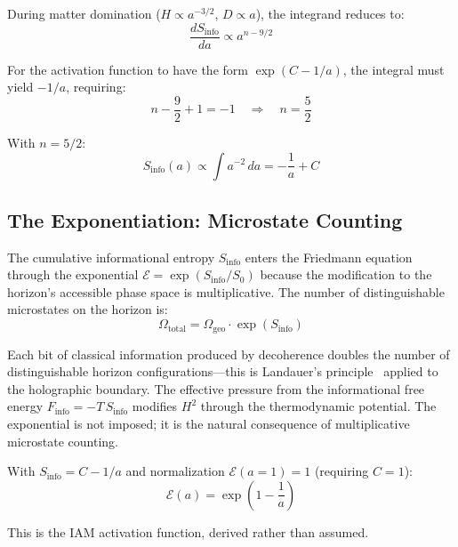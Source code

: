 \documentclass[aps,prd,twocolumn,superscriptaddress,nofootinbib]{revtex4-2}
\begin{document}
During matter domination ($H \propto a^{-3/2}$, $D \propto a$), the integrand reduces to:
\begin{equation}
\frac{dS_\text{info}}{da} \propto a^{n - 9/2}
\label{eq:integrand_scaling}
\end{equation}

For the activation function to have the form $\exp(C - 1/a)$, the integral must yield $-1/a$, requiring:
\begin{equation}
n - \frac{9}{2} + 1 = -1 \quad\Rightarrow\quad n = \frac{5}{2}
\label{eq:critical_n}
\end{equation}

With $n = 5/2$:
\begin{equation}
S_\text{info}(a) \propto \int a^{-2}\,da = -\frac{1}{a} + C
\end{equation}

\subsection{The Exponentiation: Microstate Counting}

The cumulative informational entropy $S_\text{info}$ enters the Friedmann equation through the exponential $\mathcal{E} = \exp(S_\text{info}/S_0)$ because the modification to the horizon's accessible phase space is multiplicative. The number of distinguishable microstates on the horizon is:
\begin{equation}
\Omega_\text{total} = \Omega_\text{geo}\cdot\exp(S_\text{info})
\end{equation}

Each bit of classical information produced by decoherence doubles the number of distinguishable horizon configurations---this is Landauer's principle~\cite{Landauer1961} applied to the holographic boundary. The effective pressure from the informational free energy $F_\text{info} = -T\,S_\text{info}$ modifies $H^2$ through the thermodynamic potential. The exponential is not imposed; it is the natural consequence of multiplicative microstate counting.

With $S_\text{info} = C - 1/a$ and normalization $\mathcal{E}(a=1) = 1$ (requiring $C = 1$):
\begin{equation}
\boxed{\mathcal{E}(a) = \exp\!\left(1 - \frac{1}{a}\right)}
\label{eq:activation_derived}
\end{equation}

This is the IAM activation function, derived rather than assumed.

\end{document}
